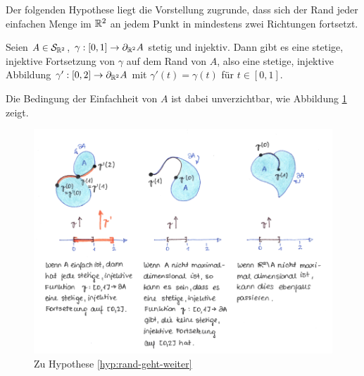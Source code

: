     Der folgenden Hypothese liegt die Vorstellung zugrunde, dass sich der Rand jeder einfachen Menge im $\mathbb{R}^2$ an jedem Punkt in mindestens zwei Richtungen fortsetzt.
    \begin{hyp}\label{hyp:rand-geht-weiter}
        Seien $A \in \mathcal{S}_{\mathbb{R}^2}$, $\gamma : [0,1] \to \partial_{\mathbb{R}^2} A$ stetig und injektiv.
        Dann gibt es eine stetige, injektive Fortsetzung von $\gamma$ auf dem Rand von $A$, 
        also eine stetige, injektive Abbildung $\gamma' : [0,2] \to \partial_{\mathbb{R}^2} A$ mit $\gamma'(t) = \gamma(t)$ für $t \in [0,1]$.
    \end{hyp}
    Die Bedingung der Einfachheit von $A$ ist dabei unverzichtbar, wie Abbildung \ref{fig:rand-geht-weiter} zeigt.
%     
     \begin{figure}[ht]
        \centering
        \includegraphics[width=\textwidth]{abb/rand-geht-weiter.png}
        \caption{Zu Hypothese \ref{hyp:rand-geht-weiter}}
        \label{fig:rand-geht-weiter}
    \end{figure}


